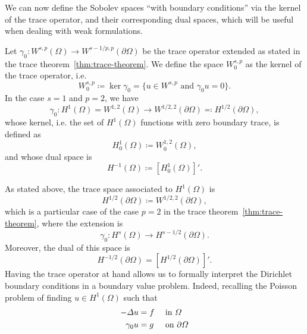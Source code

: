 We can now define the Sobolev spaces ``with boundary conditions'' via the kernel of the trace operator, and their corresponding dual spaces, which will be useful when dealing with weak formulations.
\begin{definition}\label{def:sobolev-spaces-zerobc}
    Let $\gamma_0: W^{s,p}(\Omega) \to W^{s-1/p, p}(\partial\Omega)$ be the trace operator extended as stated in the trace theorem~\ref{thm:trace-theorem}. We define the space $W_0^{s,p}$ as the kernel of the trace operator, i.e.
    \begin{equation}\label{eq:def-W0sp}
        W_0^{s,p} \coloneqq \ker \gamma_0 = \{ u \in W^{s,p} \text{ and } \gamma_0 u = 0 \}.
    \end{equation}
    In the case $s=1$ and $p=2$, we have
    \begin{equation*}
        \gamma_0: H^1(\Omega)=W^{1,2}(\Omega)\to W^{1/2,2}(\partial\Omega) \eqqcolon H^{1/2}(\partial\Omega),
    \end{equation*}
    whose kernel, i.e. the set of $H^1(\Omega)$ functions with zero boundary trace, is defined as
    \begin{equation}\label{def:H_0^1}
        H_0^1(\Omega) \coloneqq W_0^{1,2}(\Omega),
    \end{equation}
    and whose dual space is 
    \begin{equation}\label{def:H^-1}
        H^{-1}(\Omega) \coloneqq [H_0^1(\Omega)]'.
    \end{equation}
\end{definition} 
As stated above, the trace space associated to $H^1(\Omega)$ is 
\begin{equation}
    H^{1/2}(\partial\Omega) \coloneqq W^{1/2,2}(\partial\Omega),
\end{equation}
which is a particular case of the case $p=2$ in the trace theorem~\ref{thm:trace-theorem}, where the extension is 
\begin{equation*}
    \gamma_0: H^{s}(\Omega) \to H^{s-1/2}(\partial\Omega).
\end{equation*}
Moreover, the dual of this space is 
\begin{equation}
    H^{-1/2}(\partial\Omega) = [H^{1/2}(\partial\Omega)]'.
\end{equation}
Having the trace operator at hand allows us to formally interpret the Dirichlet boundary conditions in a boundary value problem. Indeed, recalling the Poisson problem of finding $u\in H^1(\Omega)$ such that
\begin{equation*}
    \begin{aligned}
        -\Delta u &= f &&\text{ in } \Omega\\
        \gamma_0 u &= g &&\text{ on } \partial\Omega
    \end{aligned}
\end{equation*}
